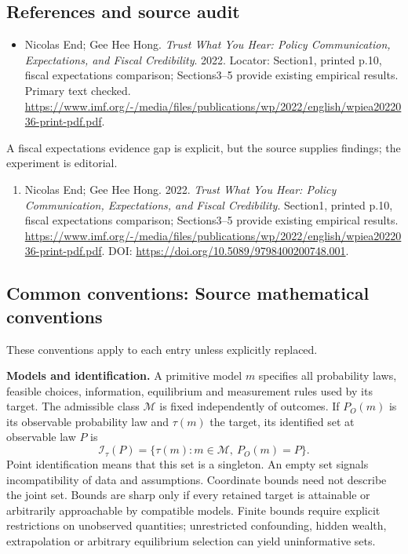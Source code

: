 \documentclass[11pt,a4paper]{article}
\begin{document}
\subsection*{References and source audit}
\begin{itemize}
\item Nicolas End; Gee Hee Hong. \emph{Trust What You Hear: Policy Communication, Expectations, and Fiscal Credibility}. 2022. Locator: Section1, printed p.10, fiscal expectations comparison; Sections3--5 provide existing empirical results. Primary text checked. \url{https://www.imf.org/-/media/files/publications/wp/2022/english/wpiea2022036-print-pdf.pdf}.
\end{itemize}
A fiscal expectations evidence gap is explicit, but the source supplies findings; the experiment is editorial.
\begin{enumerate}\raggedright
\item\hypertarget{definitions:source:30007541:1}{} Nicolas End; Gee Hee Hong. 2022. \emph{Trust What You Hear: Policy Communication, Expectations, and Fiscal Credibility}. Section1, printed p.10, fiscal expectations comparison; Sections3--5 provide existing empirical results.
\url{https://www.imf.org/-/media/files/publications/wp/2022/english/wpiea2022036-print-pdf.pdf}.
DOI: \url{https://doi.org/10.5089/9798400200748.001}.
\end{enumerate}

\subsection*{Common conventions: Source mathematical conventions}

These conventions apply to each entry unless explicitly replaced.

\textbf{Models and identification.} A primitive model \(m\) specifies all probability laws, feasible choices, information, equilibrium and measurement rules used by its target. The admissible class \(\mathcal M\) is fixed independently of outcomes. If \(P_O(m)\) is its observable probability law and \(\tau(m)\) the target, its identified set at observable law \(P\) is
\[
 \mathcal I_\tau(P)=\{\tau(m):m\in\mathcal M,\ P_O(m)=P\}.
\]
Point identification means that this set is a singleton. An empty set signals incompatibility of data and assumptions. Coordinate bounds need not describe the joint set. Bounds are sharp only if every retained target is attainable or arbitrarily approachable by compatible models. Finite bounds require explicit restrictions on unobserved quantities; unrestricted confounding, hidden wealth, extrapolation or arbitrary equilibrium selection can yield uninformative sets.
\end{document}
